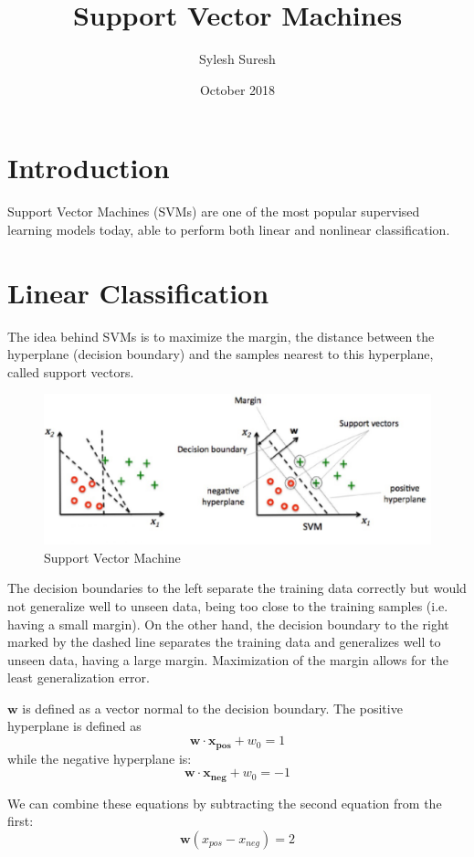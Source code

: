 \documentclass{article}
\title{Support Vector Machines}
\author{Sylesh Suresh}
\date{October 2018}
\begin{document}
\maketitle

\section{Introduction}
Support Vector Machines (SVMs) are one of the most popular supervised learning models today, able to perform both linear and nonlinear classification.
\section{Linear Classification}
The idea behind SVMs is to maximize the margin, the distance between the hyperplane (decision boundary) and the samples nearest to this hyperplane, called support vectors. 
\begin{figure}[h!]
\centering
\includegraphics[scale=0.4]{svm.jpg}
\caption{Support Vector Machine}
\label{fig:svm}
\end{figure}
The decision boundaries to the left separate the training data correctly but would not generalize well to unseen data, being too close to the training samples (i.e. having a small margin). On the other hand, the decision boundary to the right marked by the dashed line separates the training data and generalizes well to unseen data, having a large margin. Maximization of the margin allows for the least generalization error.

$\bm{w}$ is defined as a vector normal to the decision boundary. 
The positive hyperplane is defined as
\[ \bm{w \cdot x_{pos}} + w_0 = 1 \]
while the negative hyperplane is:
\[ \bm{w \cdot x_{neg}} + w_0 = -1 \]

We can combine these equations by subtracting the second equation from the first:
\begin{equation} \label{eq:hyperplanes}
\bm{w}{(x_{pos} - x_{neg})} = 2 
\end{equation}
\end{document}

